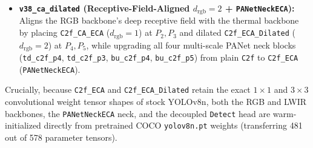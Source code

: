 \documentclass[journal,twoside,web]{ieeecolor}
\begin{document}
\begin{enumerate}
\begin{itemize}
        \item \textbf{\texttt{v38\_ca\_dilated} (Receptive-Field-Aligned $d_{\text{rgb}}=2$ + \texttt{PANetNeckECA}):} Aligns the RGB backbone's deep receptive field with the thermal backbone by placing \texttt{C2f\_CA\_ECA} ($d_{\text{rgb}}=1$) at $P_2, P_3$ and dilated \texttt{C2f\_ECA\_Dilated} ($d_{\text{rgb}}=2$) at $P_4, P_5$, while upgrading all four multi-scale PANet neck blocks (\texttt{td\_c2f\_p4}, \texttt{td\_c2f\_p3}, \texttt{bu\_c2f\_p4}, \texttt{bu\_c2f\_p5}) from plain \texttt{C2f} to \texttt{C2f\_ECA} (\texttt{PANetNeckECA}).
    \end{itemize}
\end{enumerate}

Crucially, because \texttt{C2f\_ECA} and \texttt{C2f\_ECA\_Dilated} retain the exact $1\times 1$ and $3\times 3$ convolutional weight tensor shapes of stock YOLOv8n, both the RGB and LWIR backbones, the \texttt{PANetNeckECA} neck, and the decoupled \texttt{Detect} head are warm-initialized directly from pretrained COCO \texttt{yolov8n.pt} weights (transferring 481 out of 578 parameter tensors).
\end{document}

